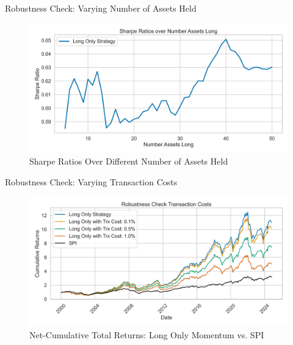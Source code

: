 \documentclass[10pt]{beamer}
\begin{document}
\begin{frame}{Robustness Check: Varying Number of Assets Held}
  \begin{figure}
   \caption{Sharpe Ratios Over Different Number of Assets Held}
        \centering
        \includegraphics[width=\linewidth]{../figures/rc_number_assets.png}
    \end{figure}
\end{frame}

\begin{frame}{Robustness Check: Varying Transaction Costs}
  \begin{figure}
   \caption{Net-Cumulative Total Returns: Long Only Momentum vs. SPI}
        \centering
        \includegraphics[width=\linewidth]{../figures/rc_trxCost.png}
    \end{figure}
\end{frame}

\end{document}
